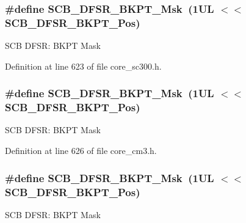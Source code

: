 \subsubsection[{\texorpdfstring{S\+C\+B\+\_\+\+D\+F\+S\+R\+\_\+\+B\+K\+P\+T\+\_\+\+Msk}{SCB_DFSR_BKPT_Msk}}]{\setlength{\rightskip}{0pt plus 5cm}\#define S\+C\+B\+\_\+\+D\+F\+S\+R\+\_\+\+B\+K\+P\+T\+\_\+\+Msk~(1\+U\+L $<$$<$ S\+C\+B\+\_\+\+D\+F\+S\+R\+\_\+\+B\+K\+P\+T\+\_\+\+Pos)}\hypertarget{group___c_m_s_i_s___s_c_b_ga609edf8f50bc49adb51ae28bcecefe1f}{}\label{group___c_m_s_i_s___s_c_b_ga609edf8f50bc49adb51ae28bcecefe1f}
S\+CB D\+F\+SR\+: B\+K\+PT Mask 

Definition at line 623 of file core\+\_\+sc300.\+h.

\subsubsection[{\texorpdfstring{S\+C\+B\+\_\+\+D\+F\+S\+R\+\_\+\+B\+K\+P\+T\+\_\+\+Msk}{SCB_DFSR_BKPT_Msk}}]{\setlength{\rightskip}{0pt plus 5cm}\#define S\+C\+B\+\_\+\+D\+F\+S\+R\+\_\+\+B\+K\+P\+T\+\_\+\+Msk~(1\+U\+L $<$$<$ S\+C\+B\+\_\+\+D\+F\+S\+R\+\_\+\+B\+K\+P\+T\+\_\+\+Pos)}\hypertarget{group___c_m_s_i_s___s_c_b_ga609edf8f50bc49adb51ae28bcecefe1f}{}\label{group___c_m_s_i_s___s_c_b_ga609edf8f50bc49adb51ae28bcecefe1f}
S\+CB D\+F\+SR\+: B\+K\+PT Mask 

Definition at line 626 of file core\+\_\+cm3.\+h.

\subsubsection[{\texorpdfstring{S\+C\+B\+\_\+\+D\+F\+S\+R\+\_\+\+B\+K\+P\+T\+\_\+\+Msk}{SCB_DFSR_BKPT_Msk}}]{\setlength{\rightskip}{0pt plus 5cm}\#define S\+C\+B\+\_\+\+D\+F\+S\+R\+\_\+\+B\+K\+P\+T\+\_\+\+Msk~(1\+U\+L $<$$<$ S\+C\+B\+\_\+\+D\+F\+S\+R\+\_\+\+B\+K\+P\+T\+\_\+\+Pos)}\hypertarget{group___c_m_s_i_s___s_c_b_ga609edf8f50bc49adb51ae28bcecefe1f}{}\label{group___c_m_s_i_s___s_c_b_ga609edf8f50bc49adb51ae28bcecefe1f}
S\+CB D\+F\+SR\+: B\+K\+PT Mask 


